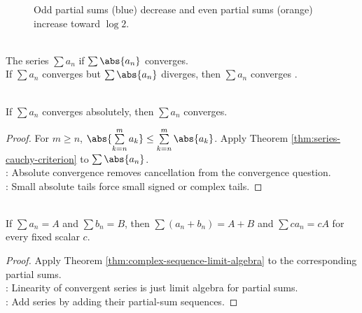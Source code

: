 \begin{figure}[H]
  \centering
  
  \caption{Odd partial sums (blue) decrease and even partial sums (orange) increase toward $\log2$.}
  \label{fig:alternating-harmonic-partial-sums}
\end{figure}

\begin{definition} \label{def:absolute-and-nonabsolute-convergence} \\
The series $\sum a_n$  if $\sum\abs{a_n}$ converges.\\
If $\sum a_n$ converges but $\sum\abs{a_n}$ diverges, then $\sum a_n$ converges .
\end{definition}

\begin{theorem} \label{thm:absolute-convergence-implies-convergence} \\
If $\sum a_n$ converges absolutely, then $\sum a_n$ converges.
\begin{proof}
For $m\geq n$, $\abs{\sum\limits_{k=n}^{m}a_k}\leq\sum\limits_{k=n}^{m}\abs{a_k}$. Apply Theorem \ref{thm:series-cauchy-criterion} to $\sum\abs{a_n}$.\\
: Absolute convergence removes cancellation from the convergence question.\\
: Small absolute tails force small signed or complex tails.
\end{proof}
\end{theorem}

\begin{theorem} \label{thm:linearity-of-convergent-series} \\
If $\sum a_n=A$ and $\sum b_n=B$, then $\sum(a_n+b_n)=A+B$ and $\sum ca_n=cA$ for every fixed scalar $c$.
\begin{proof}
Apply Theorem \ref{thm:complex-sequence-limit-algebra} to the corresponding partial sums.\\
: Linearity of convergent series is just limit algebra for partial sums.\\
: Add series by adding their partial-sum sequences.
\end{proof}
\end{theorem}

